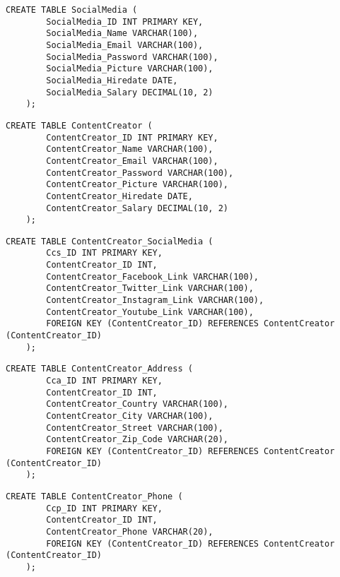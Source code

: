     \begin{lstlisting}[caption={Create SocialMedia table}, label={lst:create_socialmedia}]
    CREATE TABLE SocialMedia (
        SocialMedia_ID INT PRIMARY KEY,
        SocialMedia_Name VARCHAR(100),
        SocialMedia_Email VARCHAR(100),
        SocialMedia_Password VARCHAR(100),
        SocialMedia_Picture VARCHAR(100),
        SocialMedia_Hiredate DATE,
        SocialMedia_Salary DECIMAL(10, 2)
    );
    \end{lstlisting}
    
    \begin{lstlisting}[caption={Create ContentCreator table}, label={lst:create_contentcreator}]
    CREATE TABLE ContentCreator (
        ContentCreator_ID INT PRIMARY KEY,
        ContentCreator_Name VARCHAR(100),
        ContentCreator_Email VARCHAR(100),
        ContentCreator_Password VARCHAR(100),
        ContentCreator_Picture VARCHAR(100),
        ContentCreator_Hiredate DATE,
        ContentCreator_Salary DECIMAL(10, 2)
    );
    \end{lstlisting}
   
    \begin{lstlisting}[caption={Create ContentCreator SocialMedia table}, label={lst:create_contentcreator_socialmedia}]
    CREATE TABLE ContentCreator_SocialMedia (
        Ccs_ID INT PRIMARY KEY,
        ContentCreator_ID INT,
        ContentCreator_Facebook_Link VARCHAR(100),
        ContentCreator_Twitter_Link VARCHAR(100),
        ContentCreator_Instagram_Link VARCHAR(100),
        ContentCreator_Youtube_Link VARCHAR(100),
        FOREIGN KEY (ContentCreator_ID) REFERENCES ContentCreator (ContentCreator_ID)
    );
    \end{lstlisting}
    
    \begin{lstlisting}[caption={Create ContentCreator Address table}, label={lst:create_contentcreator_address}]
    CREATE TABLE ContentCreator_Address (
        Cca_ID INT PRIMARY KEY,
        ContentCreator_ID INT,
        ContentCreator_Country VARCHAR(100),
        ContentCreator_City VARCHAR(100),
        ContentCreator_Street VARCHAR(100),
        ContentCreator_Zip_Code VARCHAR(20),
        FOREIGN KEY (ContentCreator_ID) REFERENCES ContentCreator (ContentCreator_ID)
    );
    \end{lstlisting}
    
    \begin{lstlisting}[caption={Create ContentCreator Phone table}, label={lst:create_contentcreator_phone}]
    CREATE TABLE ContentCreator_Phone (
        Ccp_ID INT PRIMARY KEY,
        ContentCreator_ID INT,
        ContentCreator_Phone VARCHAR(20),
        FOREIGN KEY (ContentCreator_ID) REFERENCES ContentCreator (ContentCreator_ID)
    );
    \end{lstlisting}
    
